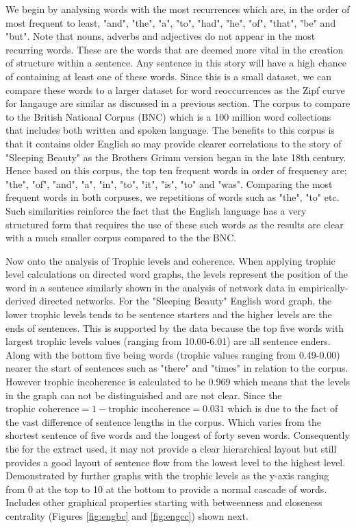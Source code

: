 We begin by analysing words with the most recurrences which are, in the order of most frequent to least, "and", "the", "a", "to", "had", "he", "of", "that", "be" and "but". Note that nouns, adverbs and adjectives do not appear in the most recurring words. These are the words that are deemed more vital in the creation of structure within a sentence. Any sentence in this story will have a high chance of containing at least one of these words. Since this is a small dataset, we can compare these words to a larger dataset for word reoccurrences as the Zipf curve for langauge are similar as discussed in a previous section. The corpus to compare to the British National Corpus (BNC)\cite{bnc2007british} which is a 100 million word collections that includes both written and spoken language. The benefits to this corpus is that it contains older English so may provide clearer correlations to the story of "Sleeping Beauty" as the Brothers Grimm version began in the late 18th century. Hence based on this corpus, the top ten frequent words\cite{leech2014word} in order of frequency are; "the", "of", "and", "a", "in", "to", "it", "is", "to" and "was". Comparing the most frequent words in both corpuses, we repetitions of words such as "the", "to" etc. Such similarities reinforce the fact that the English language has a very structured form that requires the use of these such words as the results are clear with a much smaller corpus compared to the the BNC.

Now onto the analysis of Trophic levels and coherence. When applying trophic level calculations on directed word graphs, the levels represent the position of the word in a sentence similarly shown in the analysis of network data in empirically-derived directed networks\cite{johnson2017looplessness}. For the "Sleeping Beauty" English word graph, the lower trophic levels tends to be sentence starters and the higher levels are the ends of sentences. This is supported by the data because the top five words with largest trophic levels values (ranging from 10.00-6.01) are all sentence enders. Along with the bottom five being words (trophic values ranging from 0.49-0.00) nearer the start of sentences such as "there" and "times" in relation to the corpus. However trophic incoherence is calculated to be 0.969 which means that the levels in the graph can not be distinguished and are not clear. Since the $\text{trophic coherence} = 1 - \text{trophic incoherence} = 0.031$ which is due to the fact of the vast difference of sentence lengths in the corpus. Which varies from the shortest sentence of five words and the longest of forty seven words. Consequently the for the extract used, it may not provide a clear hierarchical layout but still provides a good layout of sentence flow from the lowest level to the highest level. Demonstrated by further graphs with the trophic levels as the y-axis ranging from 0 at the top to 10 at the bottom to provide a normal cascade of words. Includes other graphical properties starting with betweenness and closeness centrality (Figures \ref{fig:engbc} and \ref{fig:engcc}) shown next.

